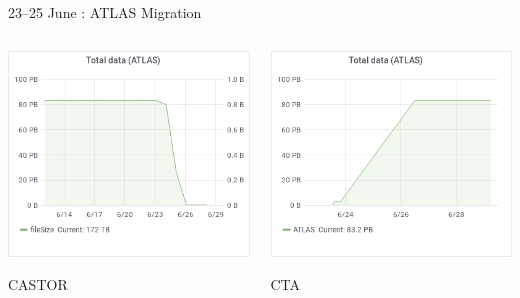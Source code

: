 \documentclass[aspectratio=1610]{beamer}
\begin{document}
\begin{frame}{23--25 June : ATLAS Migration}
\begin{columns}
	\begin{column}{0.45\textwidth}
		\begin{center}
		  \includegraphics[width=\textwidth]{images/Migration_CASTOR}

        CASTOR
		\end{center}
	\end{column}
	\begin{column}{0.45\textwidth}
		\begin{center}
		  \includegraphics[width=\textwidth]{images/Migration_CTA}

        CTA
		\end{center}
	\end{column}
\end{columns}
\end{frame}
\end{document}
